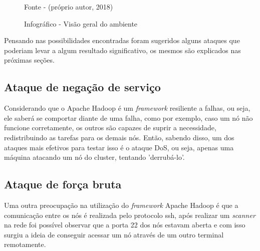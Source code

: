 \begin{figure}[htbp!] 
\begin{center}
\caption{Infográfico - Visão geral do ambiente }
\small{Fonte - (próprio autor, 2018)}
\label{Fig:EstruturaGeraldoAmbiente}
\end{center} 
\end{figure}

Pensando nas possibilidades encontradas foram sugeridos alguns ataques que poderiam levar a algum resultado significativo, os mesmos são explicados nas próximas seções.  


\subsection{Ataque de negação de serviço}
Considerando que o Apache Hadoop é um \textit{framework} resiliente a falhas, ou seja, ele saberá se comportar diante de uma falha, como por exemplo, caso um nó não funcione corretamente, os outros são capazes de suprir a necessidade, redistribuindo as tarefas para os demais nós. Então, sabendo disso, um dos ataques mais efetivos para testar isso é o ataque DoS, ou seja, apenas uma máquina atacando um nó do cluster, tentando 'derrubá-lo'.

\subsection{Ataque de força bruta}
Uma outra preocupação na utilização do \textit{framework} Apache Hadoop é que a comunicação entre os nós é realizada pelo protocolo ssh, após realizar um \textit{scanner} na rede foi possível observar que a porta 22 dos nós estavam aberta e com isso surgiu a ideia de conseguir acessar um nó através de um outro terminal remotamente.

